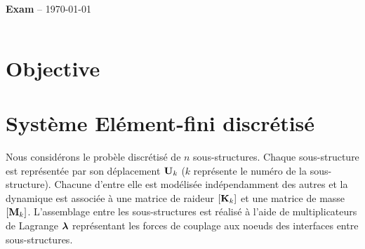 \documentclass[10pt,a4paper,french]{report}
\begin{document}
\begin{center}
{\Large }
 \begin{tabularx}{\linewidth}{c}
\hline
\end{tabularx}
\end{center}
\begin{center}
 {\Large \textbf{Exam} -- \today}
\end{center}
 \begin{tabularx}{\linewidth}{c}
\hline
\end{tabularx}
\setcounter{chapter}{1}



\section{Objective}



\section{Système Elément-fini discrétisé}

Nous considérons le probèle discrétisé de $n$ sous-structures. Chaque sous-structure est représentée par son déplacement $\textbf{U}_k$ ($k$ représente le numéro de la sous-structure). Chacune d'entre elle est modélisée indépendamment des autres et la dynamique est associée à une matrice de raideur $[\textbf{K}_k]$ et une matrice de masse $[\textbf{M}_k]$. L'assemblage entre les sous-structures est réalisé à l'aide de multiplicateurs de Lagrange $\boldsymbol{\lambda}$ représentant les forces de couplage aux noeuds des interfaces entre sous-structures.\\
\end{document}

